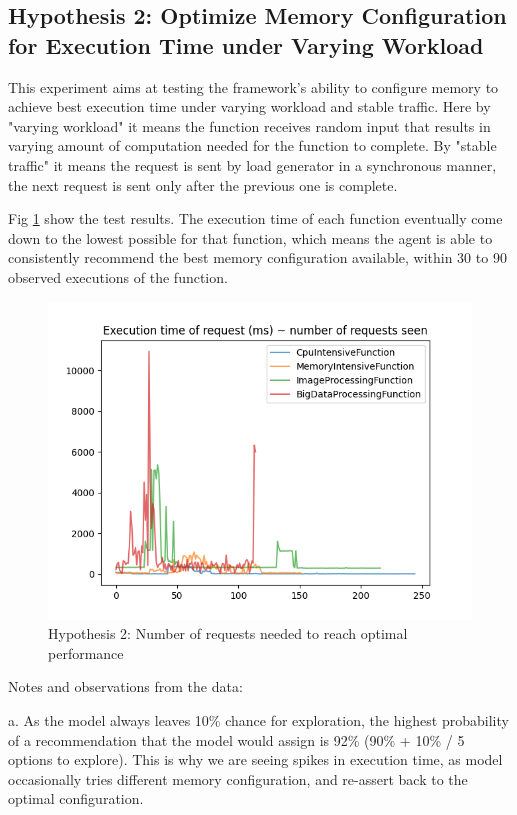 \documentclass[conference]{IEEEtran}
\begin{document}
\subsection{Hypothesis 2: Optimize Memory Configuration for Execution Time under Varying Workload}

This experiment aims at testing the framework's ability to configure memory to achieve best execution time under varying workload and stable traffic. Here by "varying workload" it means the function receives random input that results in varying amount of computation needed for the function to complete. By "stable traffic" it means the request is sent by load generator in a synchronous manner, the next request is sent only after the previous one is complete.

Fig \ref{fig: h2_results} show the test results. The execution time of each function eventually come down to the lowest possible for that function, which means the agent is able to consistently recommend the best memory configuration available, within 30 to 90 observed executions of the function. 

\begin{figure}
    \includegraphics[width=1\linewidth]{images/H2_ExecutionTimeVsNumberOfRequests.png}
    \caption{Hypothesis 2: Number of requests needed to reach optimal performance}
    \label{fig: h2_results}
\end{figure}

Notes and observations from the data:

a. As the model always leaves 10\% chance for exploration, the highest probability of a recommendation that the model would assign is 92\% (90\% + 10\% / 5 options to explore). This is why we are seeing spikes in execution time, as model occasionally tries different memory configuration, and re-assert back to the optimal configuration.
\end{document}
